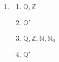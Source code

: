  \begin{solutions}{}{

\begin{enumerate}[itemsep=5pt, label=\textbf{\arabic*}. ] 
 \item \begin{multicols}{2} %
  \begin{enumerate}[noitemsep, label=\textbf{(\alph*)} ] 
    \item $\mathbb{Q}, \mathbb{Z}$ %
    \item $\mathbb{Q'}$%
    \item $\mathbb{Q}, \mathbb{Z}, \mathbb{N}, \mathbb{N}_0$%
    \item $\mathbb{Q'}$ %
  \end{enumerate} 



\end{multicols}
\end{enumerate}}
\end{solutions}
